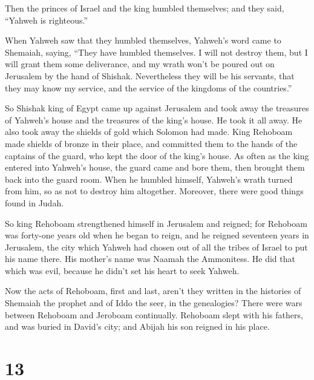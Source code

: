  Then the princes of Israel and the king humbled themselves;
and they said, ``Yahweh is righteous.''

 When Yahweh saw that they humbled themselves, Yahweh's word
came to Shemaiah, saying, ``They have humbled themselves. I will not
destroy them, but I will grant them some deliverance, and my wrath won't
be poured out on Jerusalem by the hand of Shishak. 
Nevertheless they will be his servants, that they may know my service,
and the service of the kingdoms of the countries.''

 So Shishak king of Egypt came up against Jerusalem and took
away the treasures of Yahweh's house and the treasures of the king's
house. He took it all away. He also took away the shields of gold which
Solomon had made.  King Rehoboam made shields of bronze in
their place, and committed them to the hands of the captains of the
guard, who kept the door of the king's house.  As often as
the king entered into Yahweh's house, the guard came and bore them, then
brought them back into the guard room.  When he humbled
himself, Yahweh's wrath turned from him, so as not to destroy him
altogether. Moreover, there were good things found in Judah.

 So king Rehoboam strengthened himself in Jerusalem and
reigned; for Rehoboam was forty-one years old when he began to reign,
and he reigned seventeen years in Jerusalem, the city which Yahweh had
chosen out of all the tribes of Israel to put his name there. His
mother's name was Naamah the Ammonitess.  He did that which
was evil, because he didn't set his heart to seek Yahweh.

 Now the acts of Rehoboam, first and last, aren't they
written in the histories of Shemaiah the prophet and of Iddo the seer,
in the genealogies? There were wars between Rehoboam and Jeroboam
continually.  Rehoboam slept with his fathers, and was
buried in David's city; and Abijah his son reigned in his place.

\hypertarget{section-12}{%
\section{13}\label{section-12}}

